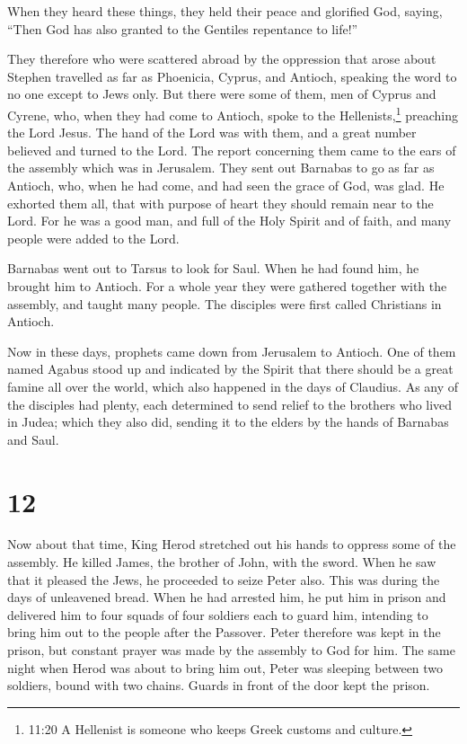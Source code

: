  When they heard these things, they held their peace and
glorified God, saying, ``Then God has also granted to the Gentiles
repentance to life!''

 They therefore who were scattered abroad by the oppression
that arose about Stephen travelled as far as Phoenicia, Cyprus, and
Antioch, speaking the word to no one except to Jews only. 
But there were some of them, men of Cyprus and Cyrene, who, when they
had come to Antioch, spoke to the Hellenists,\footnote{11:20 A Hellenist
  is someone who keeps Greek customs and culture.} preaching the Lord
Jesus.  The hand of the Lord was with them, and a great
number believed and turned to the Lord.  The report
concerning them came to the ears of the assembly which was in Jerusalem.
They sent out Barnabas to go as far as Antioch,  who, when
he had come, and had seen the grace of God, was glad. He exhorted them
all, that with purpose of heart they should remain near to the Lord.
 For he was a good man, and full of the Holy Spirit and of
faith, and many people were added to the Lord.

 Barnabas went out to Tarsus to look for Saul.
 When he had found him, he brought him to Antioch. For a
whole year they were gathered together with the assembly, and taught
many people. The disciples were first called Christians in Antioch.

 Now in these days, prophets came down from Jerusalem to
Antioch.  One of them named Agabus stood up and indicated
by the Spirit that there should be a great famine all over the world,
which also happened in the days of Claudius.  As any of the
disciples had plenty, each determined to send relief to the brothers who
lived in Judea;  which they also did, sending it to the
elders by the hands of Barnabas and Saul.

\hypertarget{section-11}{%
\section{12}\label{section-11}}

 Now about that time, King Herod stretched out his hands to
oppress some of the assembly.  He killed James, the brother
of John, with the sword.  When he saw that it pleased the
Jews, he proceeded to seize Peter also. This was during the days of
unleavened bread.  When he had arrested him, he put him in
prison and delivered him to four squads of four soldiers each to guard
him, intending to bring him out to the people after the Passover.
 Peter therefore was kept in the prison, but constant prayer
was made by the assembly to God for him.  The same night
when Herod was about to bring him out, Peter was sleeping between two
soldiers, bound with two chains. Guards in front of the door kept the
prison.

